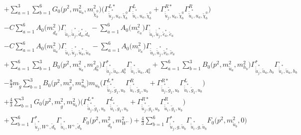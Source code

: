 \begin{itemize}
\begin{align}
 &+\sum_{a=1}^{3}\sum_{b=1}^{6}{G_0\Big(p^{2},m^2_{u_{{a}}},m^2_{\tilde{\chi}^0_{{b}}}\Big)} \Big({\Gamma^{L*}_{\check{\tilde{u}}^*_{{j}},u_{{a}},\tilde{\chi}^0_{{b}}}} {\Gamma^L_{\check{\tilde{u}}^*_{{i}},u_{{a}},\tilde{\chi}^0_{{b}}}}  + {\Gamma^{R*}_{\check{\tilde{u}}^*_{{j}},u_{{a}},\tilde{\chi}^0_{{b}}}} {\Gamma^R_{\check{\tilde{u}}^*_{{i}},u_{{a}},\tilde{\chi}^0_{{b}}}} \Big)\nonumber \\ 
 &- C \sum_{a=1}^{6}{A_0\Big(m^2_{\tilde{d}_{{a}}}\Big)} {\Gamma_{\check{\tilde{u}}_{{i}},\check{\tilde{u}}^*_{{j}},\tilde{d}^*_{{a}},\tilde{d}_{{a}}}}  - \sum_{a=1}^{6}{A_0\Big(m^2_{\tilde{e}_{{a}}}\Big)} {\Gamma_{\check{\tilde{u}}_{{i}},\check{\tilde{u}}^*_{{j}},\tilde{e}^*_{{a}},\tilde{e}_{{a}}}}  \nonumber \\ 
 &- C \sum_{a=1}^{6}{A_0\Big(m^2_{\tilde{u}_{{a}}}\Big)} {\Gamma_{\check{\tilde{u}}_{{i}},\check{\tilde{u}}^*_{{j}},\tilde{u}^*_{{a}},\tilde{u}_{{a}}}}  - \sum_{a=1}^{6}{A_0\Big(m^2_{\tilde{\nu}_{{a}}}\Big)} {\Gamma_{\check{\tilde{u}}_{{i}},\check{\tilde{u}}^*_{{j}},\tilde{\nu}^*_{{a}},\tilde{\nu}_{{a}}}}  \nonumber \\ 
 &+\sum_{a=1}^{6}\sum_{b=1}^{3}{B_0\Big(p^{2},m^2_{\tilde{u}_{{a}}},m^2_{A^0_{{b}}}\Big)} {\Gamma^*_{\check{\tilde{u}}^*_{{j}},\tilde{u}_{{a}},A^0_{{b}}}} {\Gamma_{\check{\tilde{u}}^*_{{i}},\tilde{u}_{{a}},A^0_{{b}}}} +\sum_{a=1}^{6}\sum_{b=1}^{3}{B_0\Big(p^{2},m^2_{\tilde{u}_{{a}}},m^2_{h_{{b}}}\Big)} {\Gamma^*_{\check{\tilde{u}}^*_{{j}},\tilde{u}_{{a}},h_{{b}}}} {\Gamma_{\check{\tilde{u}}^*_{{i}},\tilde{u}_{{a}},h_{{b}}}} \nonumber \\ 
 &-\frac{8}{3} m_{\tilde{g}} \sum_{b=1}^{3}{B_0\Big(p^{2},m^2_{\tilde{g}},m^2_{u_{{b}}}\Big)} m_{u_{{b}}} \Big({\Gamma^{L*}_{\check{\tilde{u}}^*_{{j}},\tilde{g}_{{1}},u_{{b}}}} {\Gamma^R_{\check{\tilde{u}}^*_{{i}},\tilde{g}_{{1}},u_{{b}}}}  + {\Gamma^{R*}_{\check{\tilde{u}}^*_{{j}},\tilde{g}_{{1}},u_{{b}}}} {\Gamma^L_{\check{\tilde{u}}^*_{{i}},\tilde{g}_{{1}},u_{{b}}}} \Big) \nonumber \\ 
 &+\frac{4}{3} \sum_{b=1}^{3}{G_0\Big(p^{2},m^2_{\tilde{g}},m^2_{u_{{b}}}\Big)} \Big({\Gamma^{L*}_{\check{\tilde{u}}^*_{{j}},\tilde{g}_{{1}},u_{{b}}}} {\Gamma^L_{\check{\tilde{u}}^*_{{i}},\tilde{g}_{{1}},u_{{b}}}}  + {\Gamma^{R*}_{\check{\tilde{u}}^*_{{j}},\tilde{g}_{{1}},u_{{b}}}} {\Gamma^R_{\check{\tilde{u}}^*_{{i}},\tilde{g}_{{1}},u_{{b}}}} \Big) \nonumber \\ 
 &+\sum_{b=1}^{6}{\Gamma^*_{\check{\tilde{u}}^*_{{j}},W^+,\tilde{d}_{{b}}}} {\Gamma_{\check{\tilde{u}}^*_{{i}},W^+,\tilde{d}_{{b}}}} {F_0\Big(p^{2},m^2_{\tilde{d}_{{b}}},m^2_{W^-}\Big)} +\frac{4}{3} \sum_{b=1}^{6}{\Gamma^*_{\check{\tilde{u}}^*_{{j}},g,\tilde{u}_{{b}}}} {\Gamma_{\check{\tilde{u}}^*_{{i}},g,\tilde{u}_{{b}}}} {F_0\Big(p^{2},m^2_{\tilde{u}_{{b}}},0\Big)}  \nonumber \\ 

\end{align}
\end{itemize}
